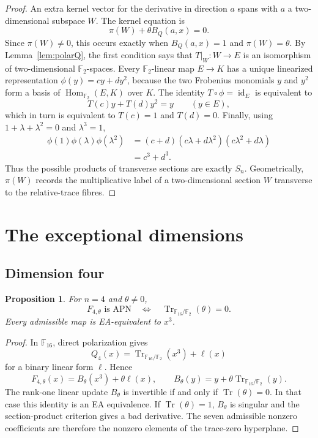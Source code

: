 \documentclass[pdflatex,sn-mathphys-num]{sn-jnl}
\theoremstyle{thmstyleone}
\newtheorem{proposition}[theorem]{Proposition}
\theoremstyle{thmstyletwo}
\theoremstyle{thmstylethree}
\newcommand{\F}{\mathbb F}
\newcommand{\Tr}{\operatorname{Tr}}
\begin{document}
\begin{proof}
An extra kernel vector for the derivative in direction $a$ spans with $a$ a two-dimensional subspace $W$.  The kernel equation is
\[
 \pi(W)+\theta B_Q(a,x)=0.
\]
Since $\pi(W)\ne0$, this occurs exactly when $B_Q(a,x)=1$ and $\pi(W)=\theta$.  By Lemma~\ref{lem:polarQ}, the first condition says that $T|_W:W\to E$ is an isomorphism of two-dimensional $\F_2$-spaces.  Every $\F_2$-linear map $E\to K$ has a unique linearized representation $\phi(y)=cy+dy^2$, because the two Frobenius monomials $y$ and $y^2$ form a basis of $\operatorname{Hom}_{\F_2}(E,K)$ over $K$. The identity $T\circ\phi=\operatorname{id}_E$ is equivalent to
\[
 T(c)y+T(d)y^2=y\qquad(y\in E),
\]
which in turn is equivalent to $T(c)=1$ and $T(d)=0$. Finally, using $1+\lambda+\lambda^2=0$ and $\lambda^3=1$,
\begin{align*}
 \phi(1)\phi(\lambda)\phi(\lambda^2)
 &=(c+d)(c\lambda+d\lambda^2)(c\lambda^2+d\lambda)\\
 &=c^3+d^3.
\end{align*}
Thus the possible products of transverse sections are exactly $S_n$. Geometrically, $\pi(W)$ records the multiplicative label of a two-dimensional section $W$ transverse to the relative-trace fibres.
\end{proof}

\section{The exceptional dimensions}\label{sec:small}

\subsection{Dimension four}

\begin{proposition}\label{prop:n4}
For $n=4$ and $\theta\ne0$,
\[
 F_{4,\theta}\text{ is APN}
 \quad\Longleftrightarrow\quad
 \Tr_{\F_{16}/\F_2}(\theta)=0.
\]
Every admissible map is EA-equivalent to $x^3$.
\end{proposition}

\begin{proof}
In $\F_{16}$, direct polarization gives
\[
 Q_4(x)=\Tr_{\F_{16}/\F_2}(x^3)+\ell(x)
\]
for a binary linear form $\ell$.  Hence
\[
 F_{4,\theta}(x)=B_\theta(x^3)+\theta\ell(x),
 \qquad B_\theta(y)=y+\theta\Tr_{\F_{16}/\F_2}(y).
\]
The rank-one linear update $B_\theta$ is invertible if and only if $\Tr(\theta)=0$.  In that case this identity is an EA equivalence.  If $\Tr(\theta)=1$, $B_\theta$ is singular and the section-product criterion gives a bad derivative.  The seven admissible nonzero coefficients are therefore the nonzero elements of the trace-zero hyperplane.
\end{proof}
\end{document}
